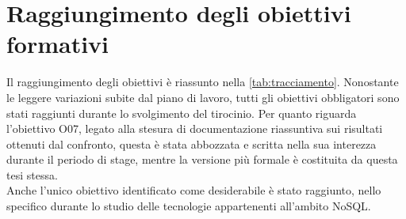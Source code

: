 \section{Raggiungimento degli obiettivi formativi}

Il raggiungimento degli obiettivi è riassunto nella \autoref{tab:tracciamento}. Nonostante le leggere variazioni subite dal piano di lavoro, tutti gli obiettivi obbligatori sono stati raggiunti durante lo svolgimento del tirocinio. Per quanto riguarda l'obiettivo O07, legato alla stesura di documentazione riassuntiva sui risultati ottenuti dal confronto, questa è stata abbozzata e scritta nella sua interezza durante il periodo di stage, mentre la  versione più formale è costituita da questa tesi stessa.\\
Anche l'unico obiettivo identificato come desiderabile è stato raggiunto, nello specifico durante lo studio delle tecnologie appartenenti all'ambito NoSQL.

